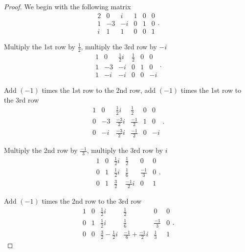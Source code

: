 \begin{proof}
    We begin with the following matrix
    \[
        \begin{array}{ccc|ccc}
            2 & 0  & i  & 1 & 0 & 0 \\
            1 & -3 & -i & 0 & 1 & 0 \\
            i & 1  & 1  & 0 & 0 & 1
        \end{array}.
    \]

    Multiply the 1st row by $\frac{1}{2}$, multiply the 3rd row by $-i$
    \[
        \begin{array}{ccc|ccc}
            1 & 0  & \frac{1}{2}i & \frac{1}{2} & 0 & 0  \\
            1 & -3 & -i           & 0           & 1 & 0  \\
            1 & -i & -i           & 0           & 0 & -i
        \end{array}.
    \]

    Add $(-1)$ times the 1st row to the 2nd row, add $(-1)$ times the 1st row to the 3rd row
    \[
        \begin{array}{ccc|ccc}
            1 & 0  & \frac{1}{2}i  & \frac{1}{2}  & 0 & 0  \\
            0 & -3 & \frac{-3}{2}i & \frac{-1}{2} & 1 & 0  \\
            0 & -i & \frac{-3}{2}i & \frac{-1}{2} & 0 & -i
        \end{array}.
    \]

    Multiply the 2nd row by $\frac{-1}{3}$, multiply the 3rd row by $i$
    \[
        \begin{array}{ccc|ccc}
            1 & 0 & \frac{1}{2}i & \frac{1}{2}   & 0            & 0 \\
            0 & 1 & \frac{1}{2}i & \frac{1}{6}   & \frac{-1}{3} & 0 \\
            0 & 1 & \frac{3}{2}  & \frac{-1}{2}i & 0            & 1
        \end{array}.
    \]

    Add $(-1)$ times the 2nd row to the 3rd row
    \[
        \begin{array}{ccc|ccc}
            1 & 0 & \frac{1}{2}i               & \frac{1}{2}                  & 0            & 0 \\
            0 & 1 & \frac{1}{2}i               & \frac{1}{6}                  & \frac{-1}{3} & 0 \\
            0 & 0 & \frac{3}{2} - \frac{1}{2}i & \frac{-1}{6} + \frac{-1}{2}i & \frac{1}{3}  & 1
        \end{array}.
    \]


\end{proof}

